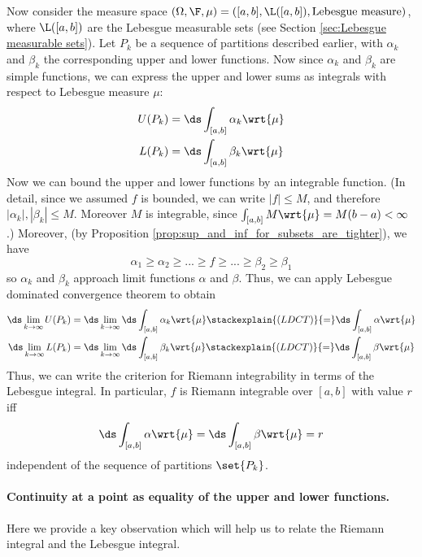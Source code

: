 \documentclass{article} %
\newcommand{\dmu}{\wrt{\mu}}
\begin{document}
Now consider the measure space $(\Omega, \F, \mu) = ([a,b], \L([a,b]), \text{Lebesgue measure})$, where $\L([a,b])$ are the Lebesgue measurable sets (see Section \ref{sec:Lebesgue measurable sets}).  Let $P_k$ be a sequence of partitions described earlier, with $\alpha_k$ and $\beta_k$ the corresponding upper and lower functions.  Now since $\alpha_k$ and $\beta_k$ are simple functions, we can express the upper and lower sums  as integrals with respect to Lebesgue measure $\mu$:
\begin{align*}
U(P_k) &= \ds\int_{[a,b]} \alpha_k \dmu \\
L(P_k) &= \ds\int_{[a,b]} \beta_k \dmu \\		
\end{align*}
Now we can bound the upper and lower functions by an integrable function. {\tiny (In detail, since we assumed $f$ is bounded,  we can write $|f| \leq M$, and therefore $|\alpha_k|,|\beta_k| \leq M$.  Moreover $M$ is integrable, since $\int_{[a,b]} M \dmu = M(b-a) < \infty$.)} Moreover, {\tiny (by Proposition \ref{prop:sup_and_inf_for_subsets_are_tighter})}, we have 
\[ \alpha_1 \geq \alpha_2 \geq ... \geq f \geq ... \geq \beta_2 \geq \beta_1 \]
so $\alpha_k$ and $\beta_k$ approach limit functions $\alpha$ and $\beta$.   Thus, we can apply Lebesgue dominated convergence theorem to obtain
\begin{align*}
\ds\lim_{k \to \infty} U(P_k) &= \ds\lim_{k \to \infty} \ds\int_{[a,b]} \alpha_k \dmu \stackexplain{(LDCT)}{=}  \ds\int_{[a,b]} \alpha \dmu  \\
\ds\lim_{k \to \infty} L(P_k) &= \ds\lim_{k \to \infty} \ds\int_{[a,b]} \beta_k \dmu \stackexplain{(LDCT)}{=}  \ds\int_{[a,b]} \beta \dmu   \\	
\end{align*}
Thus, we can write the criterion for Riemann integrability  in terms of the Lebesgue integral.  In particular, $f$ is Riemann integrable over $[a,b]$ with value $r$ iff 
\begin{align}
\ds\int_{[a,b]} \alpha \dmu = \ds\int_{[a,b]} \beta \dmu  = r
\label{eqn:criterion_for_riemann_integrability_in_terms_of_lebesgue_integral}
\end{align}
independent of the sequence of partitions $\set{P_k}$.


\paragraph{Continuity at a point as equality of the upper and lower functions.}  Here we provide a key observation which will help us to relate the Riemann integral and the Lebesgue integral. 
\end{document}
